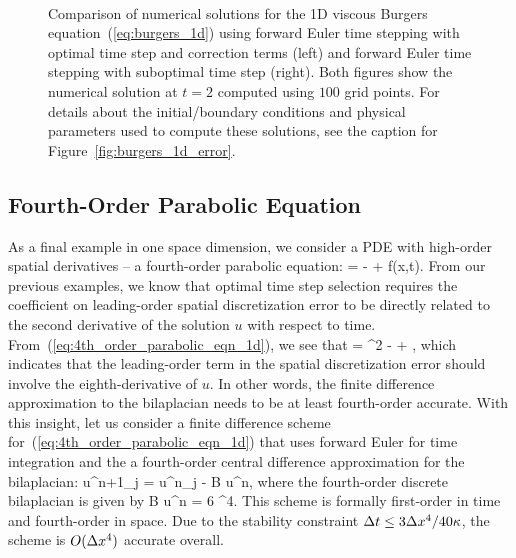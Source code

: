 \documentclass[oneeqnum,onefignum,onetabnum,onethmnum]{siamltex}
\begin{document}
\begin{figure}[tb]
\begin{center}
\ \ \ \ \ 
\caption{Comparison of numerical solutions for the 1D viscous Burgers 
equation~(\ref{eq:burgers_1d}) using forward Euler time stepping with 
optimal time step and correction terms (left) and forward Euler time 
stepping with suboptimal time step (right).  Both figures show the 
numerical solution at $t = 2$ computed using $100$ grid points.
For details about the initial/boundary conditions and physical parameters 
used to compute these solutions, see the caption for 
Figure~\ref{fig:burgers_1d_error}. 
}
\label{fig:burgers_1d_solns}
\end{center}
\end{figure}


\subsection{Fourth-Order Parabolic Equation}
As a final example in one space dimension, we consider a PDE with high-order
spatial derivatives -- a fourth-order parabolic equation: 
\beq
   = -\kappa {} + f(x,t).
  \label{eq:4th_order_parabolic_eqn_1d}
\eeq
From our previous examples, we know that optimal time step selection requires 
the coefficient on leading-order spatial discretization error to be directly 
related to the second derivative of the solution $u$ with respect to time.  
From~(\ref{eq:4th_order_parabolic_eqn_1d}), we see that 
\beq
   = 
    \kappa^2  
  - \kappa {} 
  + 
  \label{eq:4th_order_parabolic_eqn_1d_second_time_derivative},
\eeq
which indicates that the leading-order term in the spatial discretization 
error should involve the eighth-derivative of $u$.  In other words, the
finite difference approximation to the bilaplacian needs to be at least 
fourth-order accurate.  With this insight, let us consider a finite 
difference scheme for~(\ref{eq:4th_order_parabolic_eqn_1d}) that 
uses forward Euler for time integration and the a fourth-order central 
difference approximation for the bilaplacian:
\bea
  u^{n+1}_j = u^{n}_j - \kappa \dt B u^n, 
  \label{eq:4th_order_parabolic_eqn_1d_FD_scheme}
\eea
where the fourth-order discrete bilaplacian is given by
\beq
  B u^n = 
               {6 \dx^4}.
\eeq
This scheme is formally first-order in time and fourth-order in space.  
Due to the stability constraint $\Delta t \le 3\Delta x^4/40 \kappa$, the scheme is 
$O(\Delta x^4)$ accurate overall.
\end{document}
